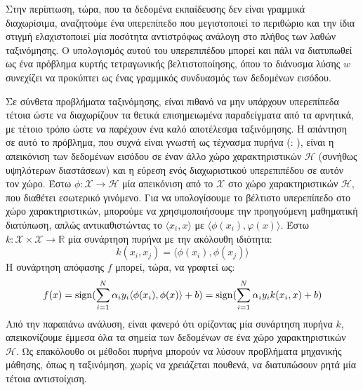 Στην περίπτωση, τώρα, που τα δεδομένα εκπαίδευσης δεν είναι γραμμικά διαχωρίσιμα, αναζητούμε ένα υπερεπίπεδο που μεγιστοποιεί το περιθώριο και την ίδια στιγμή ελαχιστοποιεί μία ποσότητα αντιστρόφως ανάλογη στο πλήθος των λαθών ταξινόμησης.
Ο υπολογισμός αυτού του υπερεπιπέδου μπορεί και πάλι να διατυπωθεί ως ένα πρόβλημα κυρτής τετραγωνικής βελτιστοποίησης, όπου το διάνυσμα λύσης $w$ συνεχίζει να προκύπτει ως ένας γραμμικός συνδυασμός των δεδομένων εισόδου.\par
Σε σύνθετα προβλήματα ταξινόμησης, είναι πιθανό να μην υπάρχουν υπερεπίπεδα τέτοια ώστε να διαχωρίζουν τα θετικά επισημειωμένα παραδείγματα από τα αρνητικά, με τέτοιο τρόπο ώστε να παρέχουν ένα καλό αποτέλεσμα ταξινόμησης.
Η απάντηση σε αυτό το πρόβλημα, που συχνά είναι γνωστή ως τέχνασμα πυρήνα (: \cite{Aizerman67theoretical, Boser1992}), είναι η απεικόνιση των δεδομένων εισόδου σε έναν άλλο χώρο χαρακτηριστικών $\mathcal{H}$ (συνήθως υψηλότερων διαστάσεων) και η εύρεση ενός διαχωριστικού υπερεπιπέδου σε αυτόν τον χώρο.
Έστω $\mathcal{\phi} : \mathcal{X} \rightarrow \mathcal{H}$ μία απεικόνιση από το $\mathcal{X}$ στο χώρο χαρακτηριστικών $\mathcal{H}$, που διαθέτει εσωτερικό γινόμενο.
Για να υπολογίσουμε το βέλτιστο υπερεπίπεδο στο χώρο χαρακτηριστικών, μπορούμε να χρησιμοποιήσουμε την προηγούμενη μαθηματική διατύπωση, απλώς αντικαθιστώντας το $\langle x_{i} , x \rangle$ με $\langle \phi(x_{i}), φ(x) \rangle$.
Έστω $k : \mathcal{X} \times \mathcal{X} \rightarrow \mathbb{R}$ μία συνάρτηση πυρήνα με την ακόλουθη ιδιότητα:
\begin{equation}
k(x_{i}, x_{j}) = \langle \phi (x_{i}), \phi (x_{j}) \rangle    
\end{equation}
Η συνάρτηση απόφασης $f$ μπορεί, τώρα, να γραφτεί ως:
\begin{equation}
f(x) = \operatorname{sign}(\sum_{i=1}^{N}\alpha_{i} y_{i} \langle \phi(x_{i}), \phi(x) \rangle + b ) = \operatorname{sign}(\sum_{i=1}^{N}\alpha_{i}y_{i} k(x_{i}, x) + b)
\end{equation}
Από την παραπάνω ανάλυση, είναι φανερό ότι ορίζοντας μία συνάρτηση πυρήνα $k$, απεικονίζουμε έμμεσα όλα τα σημεία των δεδομένων σε ένα χώρο χαρακτηριστικών $\mathcal{H}$. 
Ως επακόλουθο οι μέθοδοι πυρήνα μπορούν να λύσουν προβλήματα μηχανικής μάθησης, όπως η ταξινόμηση, χωρίς να χρειάζεται πουθενά, να διατυπώσουν ρητά μία τέτοια αντιστοίχιση.

